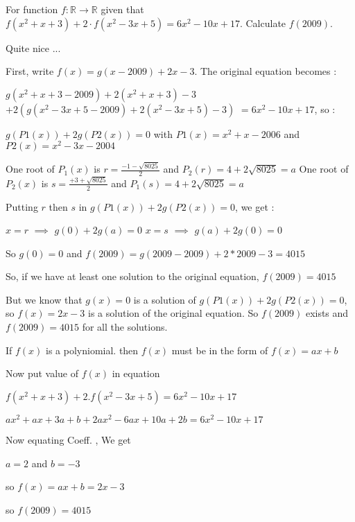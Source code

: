 \begin{solution}
	\begin{tcolorbox}For function $ f: \mathbb{R} \to \mathbb{R}$ given that $ f(x^2 + x + 3) + 2 \cdot f(x^2 - 3x + 5) = 6x^2 - 10x + 17$. Calculate $ f(2009)$.\end{tcolorbox}

Quite nice ...

First, write $ f(x)=g(x-2009)+2x-3$. The original equation becomes :

$ g(x^2+x+3-2009)+2(x^2+x+3)-3$ $ +2(g(x^2-3x+5-2009)+2(x^2-3x+5)-3)$ $ =6x^2-10x+17$, so :

$ g(P1(x))+2g(P2(x))=0$ with $ P1(x)=x^2+x-2006$ and $ P2(x)=x^2-3x-2004$

One root of $ P_1(x)$ is $ r=\frac{-1-\sqrt{8025}}{2}$ and $ P_2(r)=4+2\sqrt{8025}=a$
One root of $ P_2(x)$ is $ s=\frac{+3+\sqrt{8025}}{2}$ and $ P_1(s)=4+2\sqrt{8025}=a$

Putting $ r$ then $ s$ in $ g(P1(x))+2g(P2(x))=0$, we get :

$ x=r$ $ \implies$ $ g(0)+2g(a)=0$
$ x=s$ $ \implies$ $ g(a)+2g(0)=0$

So $ g(0)=0$ and $ f(2009)=g(2009-2009)+2*2009-3=4015$

So, if we have at least one solution to the original equation, $ f(2009)=4015$

But we know that $ g(x)=0$ is a solution of $ g(P1(x))+2g(P2(x))=0$, so $ f(x)=2x-3$ is a solution of the original equation. So $ f(2009)$ exists and  $ f(2009)=4015$ for all the solutions.
\end{solution}



\begin{solution}
	If $f(x)$ is a polyniomial. then $f(x)$ must be in the form of $f(x) =ax+b$

Now put value of $f(x)$ in equation

$f(x^2+x+3)+2.f(x^2-3x+5) = 6x^2-10x+17$

$ax^2+ax+3a+b+2ax^2-6ax+10a+2b = 6x^2-10x+17$

Now equating Coeff. , We get

$a=2$ and $b=-3$

so $f(x) = ax+b = 2x-3$

so $f(2009) = 4015$
\end{solution}



